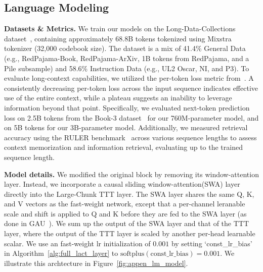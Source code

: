 

\subsection{Language Modeling}\label{sec:appen_exp_language}


\noindent\textbf{Datasets \& Metrics.}
We train our models on the Long-Data-Collections dataset~\cite{long_data_collection}, containing approximately 68.8B tokens tokenized using Mixstra tokenizer (32,000 codebook size).
The dataset is a mix of 41.4\% General Data (e.g., RedPajama-Book, RedPajama-ArXiv, 1B tokens from RedPajama, and a Pile subsample) and 58.6\% Instruction Data (e.g., UL2 Oscar, NI, and P3). 
To evaluate long-context capabilities, we utilized the per-token loss metric from~\cite{linforgetting}. A consistently decreasing per-token loss across the input sequence indicates effective use of the entire context, while a plateau suggests an inability to leverage information beyond that point. Specifically, we evaluated next-token prediction loss on 2.5B tokens from the Book-3 dataset~\cite{gao2020pile} for our 760M-parameter model, and on 5B tokens for our 3B-parameter model. Additionally, we measured retrieval accuracy using the RULER benchmark~\cite{hsiehruler} across various sequence lengths to assess context memorization and information retrieval, evaluating up to the trained sequence length.

\noindent\textbf{Model details.}
We modified the original \methodname{} block by removing its window-attention layer. Instead, we incorporate a causal sliding window-attention(SWA) layer directly into the Large-Chunk TTT layer. The SWA layer shares the same Q, K, and V vectors
as the fast-weight network, except that a per-channel leranable scale and shift is applied  
to Q and K before they are fed to the SWA layer (as done in GAU~\cite{hua2022transformer}).  We sum up the output of the SWA layer and that of the TTT layer, where the output of the TTT layer is scaled by 
another per-head learnable scalar. 
We use an fast-weight lr initialization of $0.001$ by setting `const\_lr\_bias' in Algorithm~\ref{alg:full_lact_layer} to $\mathrm{softplus}(\text{const\_lr\_bias}) = 0.001$.
We illustrate this archtecture in Figure~\ref{fig:appen_lm_model}. 

